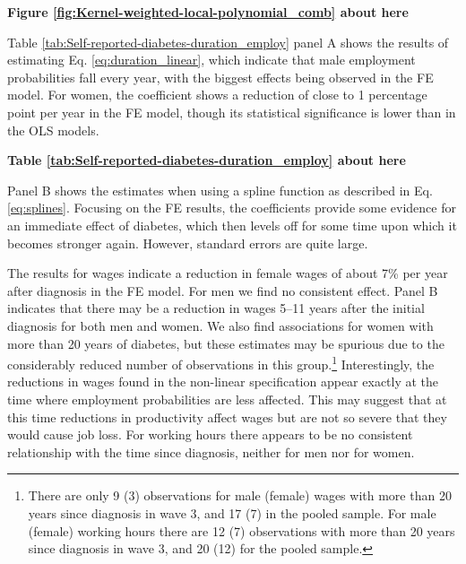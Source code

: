 \documentclass[12pt,english]{article}
\begin{document}
\begin{center}
	\textbf{Figure \ref{fig:Kernel-weighted-local-polynomial_comb} about here}
\end{center}


Table \ref{tab:Self-reported-diabetes-duration_employ} panel A shows the results of estimating Eq. \ref{eq:duration_linear}, which indicate that male employment probabilities fall every year, with the biggest effects being observed in the \ac{FE} model. For women, the coefficient shows a reduction of close to 1 percentage point per year in the \ac{FE} model, though its statistical significance is lower than in the \ac{OLS} models. 



\begin{center}
	\textbf{Table \ref{tab:Self-reported-diabetes-duration_employ} about here}
\end{center}


Panel B shows the estimates when using a spline function as described in Eq. \ref{eq:splines}. Focusing on the \ac{FE} results, the coefficients provide some evidence for an immediate effect of diabetes, which then levels off for some time upon which it becomes stronger again. However, standard errors are quite large.

The results for wages indicate a reduction in female wages of about 7\% per year after diagnosis in the \ac{FE} model. For men we find no consistent effect. Panel B indicates that there may be a reduction in wages 5--11 years after the initial diagnosis for both men and women. We also find associations for women with more than 20 years of diabetes, but these estimates may be spurious due to the considerably reduced number of observations in this group.\footnote{There are only 9 (3) observations for male (female) wages with more than 20 years since diagnosis in wave 3, and 17 (7) in the pooled sample. For male (female) working hours there are 12 (7) observations with more than 20 years since diagnosis in wave 3, and 20 (12) for the pooled sample.} Interestingly, the reductions in wages found in the non-linear specification appear exactly at the time where employment probabilities are less affected. This may suggest that at this time reductions in productivity affect wages but are not so severe that they would cause job loss. For working hours there appears to be no consistent relationship with the time since diagnosis, neither for men nor for women.
\end{document}
